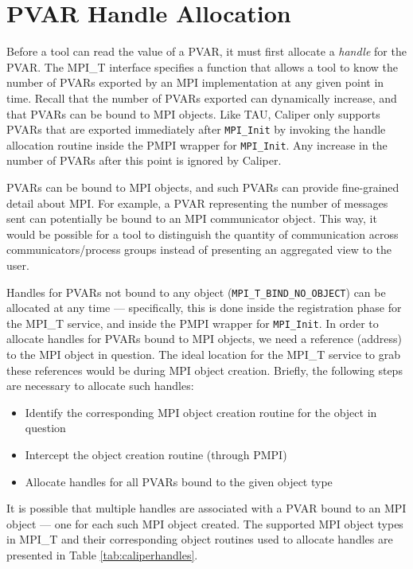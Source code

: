\section{PVAR Handle Allocation}
Before a tool can read the value of a PVAR, it must first allocate a \emph{handle} for the PVAR. The MPI\_T interface specifies a function that allows a tool to know the number of PVARs exported by an MPI implementation at any given point in time. Recall that the number of PVARs exported can dynamically increase, and that PVARs can be bound to MPI objects. Like TAU, Caliper only supports PVARs that are exported immediately after \verb+MPI_Init+ by invoking the handle allocation routine inside the PMPI wrapper for \verb+MPI_Init+. Any increase in the number of PVARs after this point is ignored by Caliper. 
\par PVARs can be bound to MPI objects, and such PVARs can provide fine-grained detail about MPI. For example, a PVAR representing the number of messages sent can potentially be bound to an MPI communicator object. This way, it would be possible for a tool to distinguish the quantity of communication across communicators/process groups instead of presenting an aggregated view to the user.
\par Handles for PVARs not bound to any object (\verb+MPI_T_BIND_NO_OBJECT+) can be allocated at any time --- specifically, this is done inside the registration phase for the MPI\_T service, and inside the PMPI wrapper for \verb+MPI_Init+. In order to allocate handles for PVARs bound to MPI objects, we need a reference (address) to the MPI object in question. The ideal location for the MPI\_T service to grab these references would be during MPI object creation. Briefly, the following steps are necessary to allocate such handles:
\begin{itemize}
\item Identify the corresponding MPI object creation routine for the object in question
\item Intercept the object creation routine (through PMPI)
\item Allocate handles for all PVARs bound to the given object type
\end{itemize}
It is possible that multiple handles are associated with a PVAR bound to an MPI object --- one for each such MPI object created. The supported MPI object types in MPI\_T and their corresponding object routines used to allocate handles are presented in Table \ref{tab:caliperhandles}.
